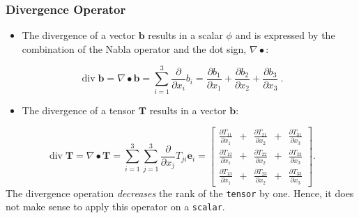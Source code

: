 \documentclass[MathematicsNumericsDerivationsAndOpenFOAM.tex]{subfiles}
\begin{document}
\subsubsection{Divergence Operator}
%
%
\begin{itemize}
    \item The divergence of a vector $\textbf{b}$ results in a scalar $\phi$
    and is expressed by the combination of the Nabla operator and the dot
    sign, $\nabla \bullet$:
\end{itemize}
%
%
\begin{equation}
 \operatorname{div} \textbf{b} = \nabla \bullet \textbf{b} = \sum_{i=1}^{3} \frac{\partial}{\partial x_i} b_i
=
  \frac{\partial b_1}{\partial x_1} + \frac{\partial b_2}{\partial x_2} + \frac{\partial b_3}{\partial x_3} ~.
  \label{EQUATION::divVector}
\end{equation}
%
%
\begin{itemize}
    \item The divergence of a tensor $\textbf{T}$ results in a vector $\textbf{b}$:
\end{itemize}
%
%
\begin{equation}
  \operatorname{div} \textbf{T} = \nabla \bullet \textbf{T}
=
  \sum_{i=1}^{3}\sum_{j=1}^{3} \frac{\partial}{\partial x_j} T_{ji} \textbf{e}_i
=
  \left[
  \begin{matrix}
   \frac{\partial T_{11}}{\partial x_1} ~ ~ + ~ ~ \frac{\partial T_{21}}{\partial x_2} ~ ~ + ~ ~ \frac{\partial T_{31}}{\partial x_3} \\
   \frac{\partial T_{12}}{\partial x_1} ~ ~ + ~ ~ \frac{\partial T_{22}}{\partial x_2} ~ ~ + ~ ~ \frac{\partial T_{32}}{\partial x_3} \\
   \frac{\partial T_{13}}{\partial x_1} ~ ~ + ~ ~ \frac{\partial T_{23}}{\partial x_2} ~ ~ + ~ ~ \frac{\partial T_{33}}{\partial x_3}
  \end{matrix}
  \right] .
  \label{EQUATION::divTensor}
\end{equation}
%
%
    The divergence operation \textit{decreases} the rank of the \texttt{tensor}
    by one. Hence, it does not make sense to apply this operator on a
    \texttt{scalar}.
%
%
%
%
\end{document}
